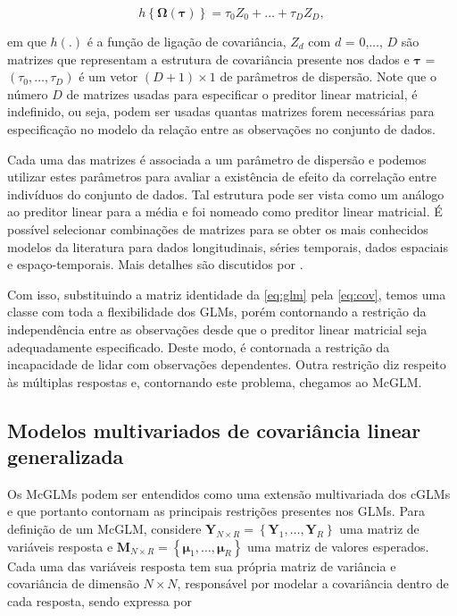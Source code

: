 \begin{equation}
\label{eq:cov}
h\left \{ \boldsymbol{\Omega}(\boldsymbol{\tau}) \right \} = \tau_0Z_0 + \ldots + \tau_DZ_D,
\end{equation}

\noindent em que $h(.)$ é a função de ligação de covariância, $Z_d$ com $d$ = 0,$\ldots$, $D$ são matrizes que representam a estrutura de covariância presente nos dados e $\boldsymbol{\tau}$ = $(\tau_0, \ldots, \tau_D)$ é um vetor $(D + 1) \times 1$ de parâmetros de dispersão. Note que o número $D$ de matrizes usadas para especificar o preditor linear matricial, é indefinido, ou seja, podem ser usadas quantas matrizes forem necessárias para especificação no modelo da relação entre as observações no conjunto de dados.

Cada uma das matrizes é associada a um parâmetro de dispersão e podemos utilizar estes parâmetros para avaliar a existência de efeito da correlação entre indivíduos do conjunto de dados. Tal estrutura pode ser vista como um análogo ao preditor linear para a média e foi nomeado como preditor linear matricial. É possível selecionar combinações de matrizes para se obter os mais conhecidos modelos da literatura para dados longitudinais, séries temporais, dados espaciais e espaço-temporais. Mais detalhes são discutidos por \citet{Demidenko13}.

Com isso, substituindo a matriz identidade da \autoref{eq:glm} pela \autoref{eq:cov}, temos uma classe com toda a flexibilidade dos GLMs, porém contornando a restrição da independência entre as observações desde que o preditor linear matricial seja adequadamente especificado. Deste modo, é contornada a restrição da incapacidade de lidar com observações dependentes. Outra restrição diz respeito às múltiplas respostas e, contornando este problema, chegamos ao McGLM.

\subsection{Modelos multivariados de covariância linear generalizada}

Os McGLMs podem ser entendidos como uma extensão multivariada dos cGLMs e que portanto contornam as principais restrições presentes nos GLMs. Para definição de um McGLM, considere $\boldsymbol{Y}_{N \times
R} = \left \{ \boldsymbol{Y}_1, \dots, \boldsymbol{Y}_R \right \}$ uma  matriz de variáveis resposta e $\boldsymbol{M}_{N \times R} = \left \{ \boldsymbol{\mu}_1, \dots, \boldsymbol{\mu}_R \right \}$ uma matriz de valores esperados. Cada uma das variáveis resposta tem sua própria matriz de variância e covariância de dimensão $N \times N$, responsável por modelar a covariância dentro de cada resposta, sendo expressa por

